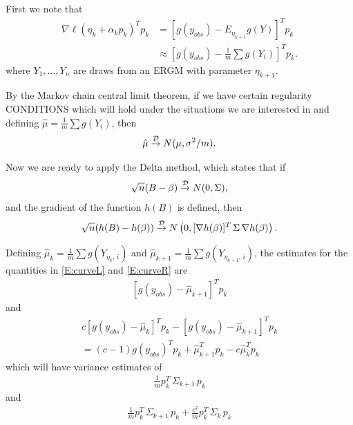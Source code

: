 First we note that
\begin{align*}
\nabla \ell( \eta_k + \alpha_k p_k)^T p_k &=  [ g(y_{obs}) - E_{\eta_{k+1}}g(Y)]^T p_k \\
		&\approx  \left [ g(y_{obs}) - \frac{1}{m}\sum g(Y_i)\right ]^T p_k.
\end{align*}
where $Y_1, \ldots, Y_n$ are draws from an ERGM with parameter $\eta_{k+1}$.

By the Markov chain central limit theorem, if we have certain regularity CONDITIONS which will hold under the situations we are interested in and defining $\hat{\mu} = \frac{1}{m}\sum g(Y_i)$, then 
\begin{align*}
	\hat{\mu} \overset{\mathcal{D}}{\to} N( \mu, \sigma^2/m).
\end{align*} 

Now we are ready to apply the Delta method, which states that if
\begin{align*}
	\sqrt{n}( B - \beta) \overset{\mathcal{D}}{\to} N(0, \Sigma),
\end{align*}
and the gradient of the function $h(B)$ is defined, then
\begin{align*}
	\sqrt{n}( h(B) - h(\beta) ) \stackrel{\mathcal{D}}{\to} N \left (0, [\nabla h(\beta)]^T  \, \Sigma  \, \nabla h(\beta) \right ).
\end{align*}


Defining $\hat{\mu}_k = \frac{1}{m}\sum g(Y_{\eta_k, \, i})$ and $\hat{\mu}_{k+1} = \frac{1}{m}\sum g(Y_{\eta_{k+1}, \, i})$, the estimates for the quantities in \eqref{E:curveL} and \eqref{E:curveR} are
\begin{align*}
 	\left [ g(y_{obs}) - \hat{\mu}_{k+1} \right ]^T p_k
\end{align*}
and
\begin{align*}
	c \left [ g(y_{obs}) - \hat{\mu}_k \right ]^T p_k - \left [ g(y_{obs}) - \hat{\mu}_{k+1} \right ]^T p_k \\
	= (c-1) g(y_{obs})^T p_k + \hat{\mu}_{k+1}^T p_k - c \hat{\mu}_{k}^T p_k 
\end{align*}
which will have variance estimates of 
\begin{align*}
	  \frac{1}{m} p_k^T \, \Sigma_{k+1} \, p_k    
\end{align*}
and
\begin{align*}
	 \frac{1}{m} p_k^T \, \Sigma_{k+1} \, p_k + \frac{c^2}{m} p_k^T \, \Sigma_{k} \, p_k    
\end{align*}

